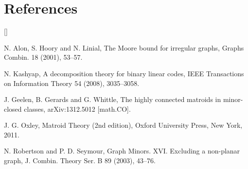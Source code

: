 \documentclass[12pt]{amsart}
\theoremstyle{definition}
\begin{document}
\section*{References}


\begin{list}{[]}
{\setlength{\leftmargin}{10mm}\setlength{\itemsep}{0mm}}


\item\label{alonetal}
N. Alon, S. Hoory and N. Linial, The Moore bound for irregular graphs, Graphs Combin. 18 (2001), 53--57. 

\item\label{kashyap}
N. Kashyap, A decomposition theory for binary linear codes, IEEE Transactions on Information Theory 54 (2008), 3035--3058.

\item\label{ggw}
J. Geelen, B. Gerards and G. Whittle, The highly connected matroids in minor-closed classes, arXiv:1312.5012 [math.CO].

\item\label{ox2}
J. G. Oxley, 
Matroid Theory (2nd edition),
Oxford University Press, New York, 2011.

\item\label{rs}
N. Robertson and P. D. Seymour, Graph Minors. XVI. Excluding a non-planar
graph, J. Combin. Theory Ser. B 89 (2003), 43--76.

\end{list}
\end{document}
